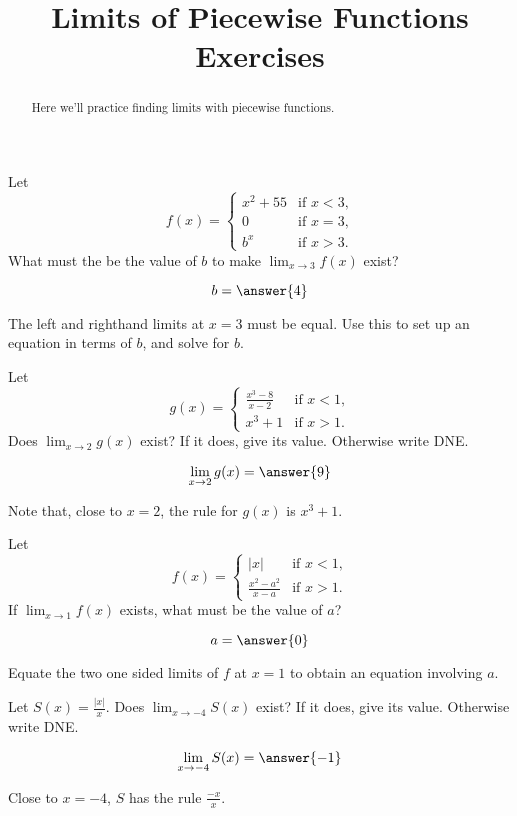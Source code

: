 \documentclass[handout]{ximera}
\title[Exercises:]{Limits of Piecewise Functions Exercises}
\begin{document}
\begin{abstract}
  Here we'll practice finding limits with piecewise functions.
\end{abstract}
\maketitle

\begin{exercise}
Let
\[
f(x) =
\begin{cases} x^2+55 &\text{if $x<3$,}\\
  0 &\text{if $x=3$,} \\
  b^x &\text{if $x>3$.}
\end{cases}
\]  
What must the be the value of $b$ to make $\lim_{x \to 3} f(x)$ exist?

\[
b = \answer{4}
\]

\begin{hint}
  The left and righthand limits at $x=3$ must be equal.  Use this to
  set up an equation in terms of $b$, and solve for $b$.
\end{hint}
\end{exercise}

\begin{exercise}
Let
\[
g(x) = \begin{cases}
  \frac{x^3 - 8}{x-2}  &\text{if $x<1$,} \\
  x^3+1 &\text{if  $x>1$.}
\end{cases}
\]
Does $\lim_{x \to 2} g(x)$ exist?  If it does, give its value.
Otherwise write DNE.

\[
\lim_{x \to 2} g(x) = \answer{9}
\]

\begin{hint}
	Note that, close to $x=2$, the rule for $g(x)$ is $x^3+1$.
\end{hint}

\end{exercise}


\begin{exercise}
Let
\[
f(x) = \begin{cases}
  |x| &\text{if $x<1$,} \\
  \frac{x^2-a^2}{x-a} &\text{if $x>1$.}
\end{cases}
\]
If $\lim_{x \to 1} f(x)$ exists, what must be the value of $a$?

  \[
a = \answer{0}
\]

\begin{hint}
  Equate the two one sided limits of $f$ at $x=1$ to obtain an equation involving $a$.
\end{hint}

\end{exercise}

\begin{exercise}
Let $S(x) = \frac{|x|}{x}$.  Does $\lim_{x \to -4} S(x)$ exist?  If it
does, give its value.  Otherwise write DNE.

\[
\lim_{x \to -4} S(x) = \answer{-1}
\] 

\begin{hint}
  Close to $x=-4$, $S$ has the rule $\frac{-x}{x}$.
\end{hint}


\end{exercise}
\end{document}
